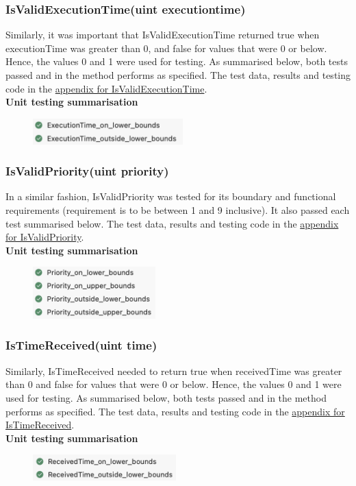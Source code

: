 \documentclass[a4paper]{article}
\begin{document}
\subsubsection{IsValidExecutionTime(uint executiontime)}
Similarly, it was important that IsValidExecutionTime returned true when executionTime was greater than 0, and false for values that were 0 or below. Hence, the values 0 and 1 were used for testing. As summarised below, both tests passed and in the method performs as specified. The test data, results and testing code in the \hyperlink{subsubsection.5.1.3}{appendix for IsValidExecutionTime}.
\\[6pt]
\textbf{Unit testing summarisation}
\begin{figure}[H]
   \includegraphics[height=1cm]{images/IsValidExecutionTime-summary.png}
\end{figure}

\subsubsection{IsValidPriority(uint priority)}
In a similar fashion, IsValidPriority was tested for its boundary and functional requirements (requirement is to be between 1 and 9 inclusive). It also passed each test summarised below. The test data, results and testing code in the \hyperlink{subsubsection.5.1.3}{appendix for IsValidPriority}.
\\[6pt]
\textbf{Unit testing summarisation}
\begin{figure}[H]
   \includegraphics[height=2cm]{images/IsValidPriority-summary.png}
\end{figure}

\subsubsection{IsTimeReceived(uint time)}
Similarly, IsTimeReceived needed to return true when receivedTime was greater than 0 and false for values that were 0 or below. Hence, the values 0 and 1 were used for
testing. As summarised below, both tests passed and in the method performs as specified. The
test data, results and testing code in the \hyperlink{subsubsection.5.1.4}{appendix for IsTimeReceived}.
\\[6pt]
\textbf{Unit testing summarisation}
\begin{figure}[H]
   \includegraphics[height=1cm]{images/IsTimeReceived-summary.png}
\end{figure}
\end{document}
